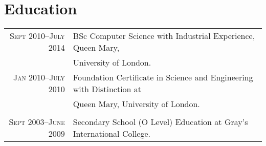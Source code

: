 \documentclass[a4paper,10pt]{article}
\begin{document}
\section{Education}
\begin{tabular}{rl}
  \textsc{Sept} 2010--\textsc{July} 2014 & BSc Computer Science with Industrial Experience, Queen
  Mary,\\& University of London.\\

  \textsc{Jan} 2010--\textsc{July} 2010 & Foundation Certificate in Science and Engineering with
  Distinction at\\& Queen Mary, University of London.\\&\\

  \textsc{Sept} 2003--\textsc{June} 2009 & Secondary School (O Level) Education at Gray’s
  International College.
\end{tabular}

\end{document}
